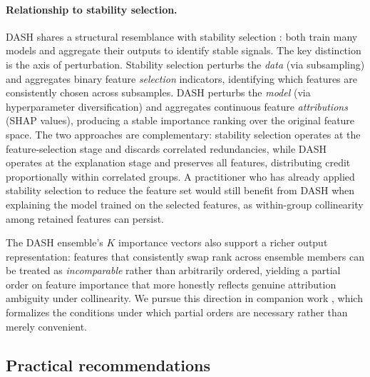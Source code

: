\documentclass[11pt]{article}
\newcommand{\dash}{\textsc{DASH}}
\begin{document}
\paragraph{Relationship to stability selection.}
\dash{} shares a structural resemblance with stability selection
\citep{meinshausen2010stability}: both train many models and aggregate
their outputs to identify stable signals. The key distinction is the
axis of perturbation. Stability selection perturbs the \emph{data}
(via subsampling) and aggregates binary feature \emph{selection}
indicators, identifying which features are consistently chosen across
subsamples. \dash{} perturbs the \emph{model} (via hyperparameter
diversification) and aggregates continuous feature \emph{attributions}
(SHAP values), producing a stable importance ranking over the original
feature space. The two approaches are complementary: stability selection
operates at the feature-selection stage and discards correlated
redundancies, while \dash{} operates at the explanation stage and
preserves all features, distributing credit proportionally within
correlated groups. A practitioner who has already applied stability
selection to reduce the feature set would still benefit from \dash{}
when explaining the model trained on the selected features, as
within-group collinearity among retained features can persist.

The \dash{} ensemble's $K$ importance vectors also support a richer
output representation: features that consistently swap rank across
ensemble members can be treated as \emph{incomparable} rather than
arbitrarily ordered, yielding a partial order on feature importance
that more honestly reflects genuine attribution ambiguity under
collinearity. We pursue this direction in companion work
\citep{caraker2026impossibility}, which formalizes the conditions under
which partial orders are necessary rather than merely convenient.

\subsection{Practical recommendations}
\end{document}
